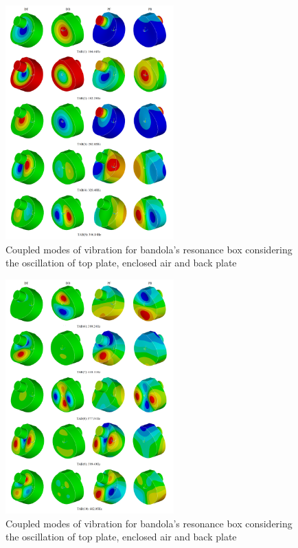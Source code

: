 \begin{figure}[h]
\centering
\includegraphics[height=9cm]{img/FSI3a.png}
\caption{Coupled modes of vibration for bandola's resonance box considering the oscillation of top plate, enclosed air and back plate}
\label{CoupledModes3a}
\end{figure}

\begin{figure}[h]
\centering
\includegraphics[height=9cm]{img/FSI3b.png}
\caption{Coupled modes of vibration for bandola's resonance box considering the oscillation of top plate, enclosed air and back plate}
\label{CoupledModes3b}
\end{figure}

